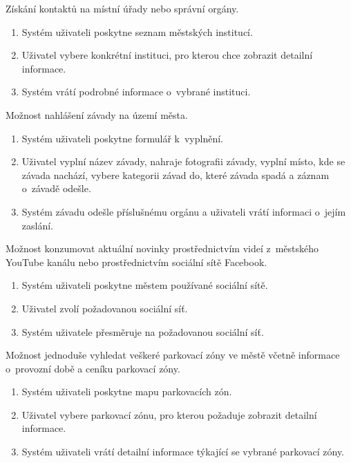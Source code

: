 Získání kontaktů na místní úřady nebo správní orgány. 

\begin{enumerate}
  \item Systém uživateli poskytne seznam městských institucí.
  \item Uživatel vybere konkrétní instituci, pro kterou chce zobrazit detailní informace.
  \item Systém vrátí podrobné informace o~vybrané instituci.  
\end{enumerate}

Možnost nahlášení závady na území města.

\begin{enumerate}
  \item Systém uživateli poskytne formulář k~vyplnění. %
  \item Uživatel vyplní název závady, nahraje fotografii závady, vyplní místo, kde se závada nachází, vybere kategorii závad do, které závada spadá a 
  záznam o~závadě odešle.
  \item Systém závadu odešle příslušnému orgánu a uživateli vrátí informaci o~jejím zaslání.
  
\end{enumerate}

Možnost konzumovat aktuální novinky prostřednictvím videí z~městského YouTube kanálu nebo prostřednictvím sociální sítě Facebook.

\begin{enumerate}
  \item Systém uživateli poskytne městem používané sociální sítě.
  \item Uživatel zvolí požadovanou sociální síť.
  \item Systém uživatele přesměruje na požadovanou sociální síť.
\end{enumerate}

Možnost jednoduše vyhledat veškeré parkovací zóny ve městě včetně informace o~provozní době a ceníku parkovací zóny.

\begin{enumerate}
  \item Systém uživateli poskytne mapu parkovacích zón.
  \item Uživatel vybere parkovací zónu, pro kterou požaduje zobrazit detailní informace.
  \item Systém uživateli vrátí detailní informace týkající se vybrané parkovací zóny.
\end{enumerate}

